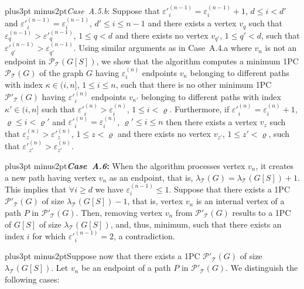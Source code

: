 \documentclass[10pt]{article}
\def\yskip{\penalty-50\vskip3pt plus3pt minus2pt}
\def\y{\yskip}
\begin{document}
{\y \textit{Case~A.5.b}: Suppose that $\varepsilon'^{(n-1)}_i =
\varepsilon^{(n-1)}_i +1$, $d \leq i < d'$ and
$\varepsilon'^{(n-1)}_i = \varepsilon^{(n-1)}_i$, $d' \leq i \leq
n-1$ and there exists a vertex $v_q$ such that
$\varepsilon^{(n-1)}_q > \varepsilon'^{(n-1)}_q$, $1 \leq q < d$
and there exists no vertex $v_{q'}$, $1 \leq q' <d$, such that
$\varepsilon'^{(n-1)}_{q'}>\varepsilon^{(n-1)}_{q'}$. Using
similar arguments as in Case~A.4.a where $v_n$ is not an endpoint
in $\mathcal{P_{\mathcal{T}}}(G[S])$, we show that the algorithm
computes a minimum 1PC $\mathcal{P_{\mathcal{T}}}(G)$ of the graph
$G$ having $\varepsilon^{(n)}_i$ endpoints $v_\kappa$ belonging to
different paths with index $\kappa \in (i,n]$, $1 \leq i \leq n$,
such that there is no other minimum 1PC
$\mathcal{P'_{\mathcal{T}}}(G)$ having $\varepsilon'^{(n)}_i$
endpoints $v_{\kappa'}$ belonging to different paths with index
$\kappa' \in (i,n]$ such that
$\varepsilon'^{(n)}_i>\varepsilon^{(n)}_i$, $1 \leq i < \varrho$.
Furthermore, if $\varepsilon'^{(n)}_i = \varepsilon^{(n)}_i +1$,
$\varrho \leq i < \varrho'$ and $\varepsilon'^{(n)}_i =
\varepsilon^{(n)}_i$, $\varrho' \leq i \leq n$ then there exists a
vertex $v_z$ such that $\varepsilon^{(n)}_z >
\varepsilon'^{(n)}_z$, $1 \leq z < \varrho$ and there exists no
vertex $v_{z'}$, $1 \leq z' <\varrho$, such that
$\varepsilon'^{(n)}_{z'}>\varepsilon^{(n)}_{z'}$.


\y {\bf \textit{Case~A.6}:} When the algorithm processes vertex
$v_n$, it creates a new path having vertex $v_n$ as an endpoint,
that is, $\lambda_\mathcal{T}(G)=\lambda_\mathcal{T}(G[S])+1$.
This implies that $\forall i \geq d$ we have
$\varepsilon^{(n-1)}_i \leq 1$. Suppose that there exists a 1PC
$\mathcal{P'_{\mathcal{T}}}(G)$ of size
$\lambda_\mathcal{T}(G[S])-1$, that is, vertex $v_n$ is an
internal vertex of a path $P$ in $\mathcal{P'_{\mathcal{T}}}(G)$.
Then, removing vertex $v_n$ from $\mathcal{P'_{\mathcal{T}}}(G)$
results to a 1PC of $G[S]$ of size $\lambda_\mathcal{T}(G[S])$,
and, thus, minimum, such that there exists an index $i$ for which
$\varepsilon'^{(n-1)}_i=2$, a contradiction.

\y Suppose now that there exists a 1PC
$\mathcal{P'_{\mathcal{T}}}(G)$ of size
$\lambda_\mathcal{T}(G[S])$. Let $v_n$ be an endpoint of a path
$P$ in $\mathcal{P'_{\mathcal{T}}}(G)$. We distinguish the
following cases:

}
\end{document}
